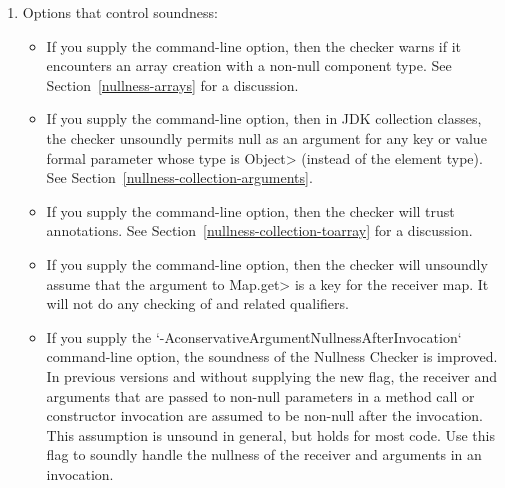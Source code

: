 \begin{enumerate}
\item
  Options that control soundness:

\begin{itemize}
\item
  \label{nullness-lint-soundArrayCreationNullness}%
  \label{nullness-lint-nonnullarraycomponents}%
  If you supply the  command-line
  option, then the checker warns if it encounters an array creation
  with a non-null component type.
  See Section~\ref{nullness-arrays} for a discussion.

\item
  \label{collection-object-parameters-may-be-null}
  If you supply the
  command-line option, then in JDK collection classes, the checker
  unsoundly permits null as an argument for any key or value formal
  parameter whose type is \<Object> (instead of the element type).
  See Section~\ref{nullness-collection-arguments}.

\item
  \label{nullness-lint-trustarraylenzero}%
  If you supply the  command-line option, then
  the checker will trust 
  annotations. See Section~\ref{nullness-collection-toarray} for a discussion.

\item
  \label{nullness-assumeKeyFor}%
  If you supply the  command-line option, then the
  checker will unsoundly assume that the argument to \<Map.get> is a key
  for the receiver map.  It will not do any checking of
   and related qualifiers.

\item
  \label{nullness-conservativeArgumentNullnessAfterInvocation}%
  If you supply the `-AconservativeArgumentNullnessAfterInvocation` command-line option, the soundness of
  the Nullness Checker is improved. In previous versions and without supplying the new flag, the receiver and
  arguments that are passed to non-null parameters in a method call
  or constructor invocation are assumed to be non-null after the invocation.
  This assumption is unsound in general, but holds for most code.
  Use this flag to soundly handle the nullness of the receiver and arguments in an invocation.


\end{itemize}
\end{enumerate}
